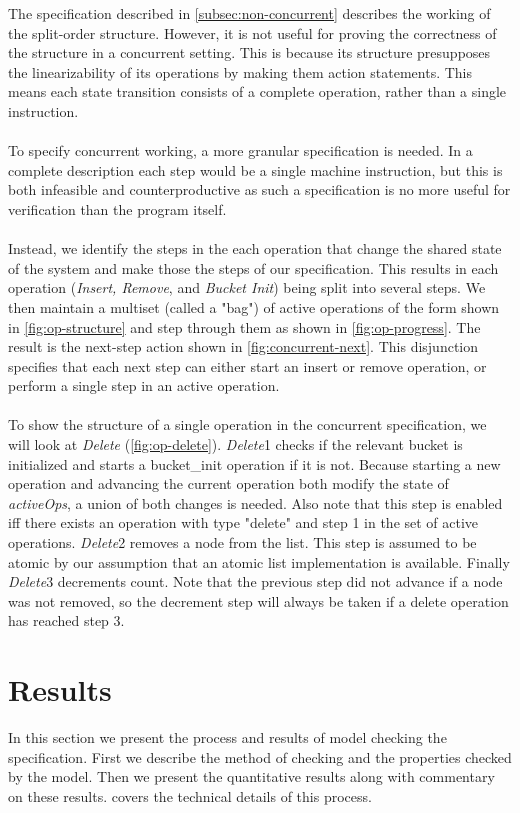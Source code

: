 \documentclass{uit-thesis}
\begin{document}
The specification described in \autoref{subsec:non-concurrent} describes the working of the split-order structure. However, it is not useful for proving the correctness of the structure in a concurrent setting. This is because its structure presupposes the linearizability of its operations by making them action statements. This means each state transition consists of a complete operation, rather than a single instruction.
\\\\
To specify concurrent working, a more granular specification is needed. In a complete description each step would be a single machine instruction, but this is both infeasible and counterproductive as such a specification is no more useful for verification than the program itself.
\\\\
Instead, we identify the steps in the each operation that change the shared state of the system and make those the steps of our specification. This results in each operation (\textit{Insert, Remove}, and \textit{Bucket Init}) being split into several steps. We then maintain a multiset (called a "bag") of active operations of the form shown in \autoref{fig:op-structure} and step through them as shown in \autoref{fig:op-progress}. The result is the next-step action shown in \autoref{fig:concurrent-next}. This disjunction specifies that each next step can either start an insert or remove operation, or perform a single step in an active operation.
\\\\
To show the structure of a single operation in the concurrent specification, we will look at \textit{Delete} (\autoref{fig:op-delete}). \textit{Delete}1 checks if the relevant bucket is initialized and starts a bucket\_init operation if it is not. Because starting a new operation and advancing the current operation both modify the state of \textit{activeOps}, a union of both changes is needed. Also note that this step is enabled iff there exists an operation with type "delete" and step 1 in the set of active operations. \textit{Delete}2 removes a node from the list. This step is assumed to be atomic by our assumption that an atomic list implementation is available. Finally \textit{Delete}3 decrements count. Note that the previous step did not advance if a node was not removed, so the decrement step will always be taken if a delete operation has reached step 3.

\chapter{Results}\label{ch:results}
In this section we present the process and results of model checking the specification. First we describe the method of checking and the properties checked by the model. Then we present the quantitative results along with commentary on these results.  covers the technical details of this process.
\end{document}
